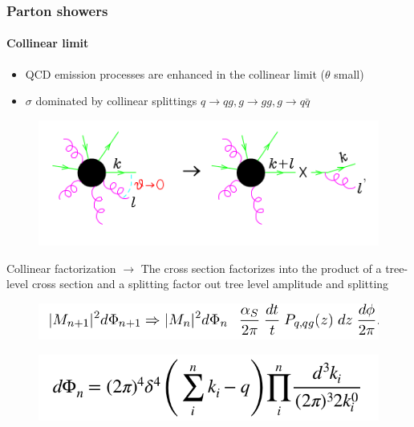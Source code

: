 \documentclass[aspectratio=43]{beamer}
\begin{document}
\begin{frame}

	\frametitle{Parton showers}
	\framesubtitle{Collinear limit}
	
	\begin{itemize} 
		\item \footnotesize QCD emission processes are enhanced in the collinear limit ($\theta$ small)
		\item \footnotesize $\sigma$ dominated by collinear splittings $q \rightarrow qg, g \rightarrow gg, g \rightarrow q\bar{q}$
	\end{itemize}
	
	\begin{figure}
		\includegraphics[width = 6 cm]{plots/collinear_factorization.png}
	\end{figure}
	
	\footnotesize Collinear factorization $\longrightarrow$ The cross section factorizes
	into the product of a tree-level cross section and a splitting
	factor out tree level amplitude and splitting
	\begin{figure}
		\includegraphics[width = 7 cm]{plots/eq_factorization_theorem.png}
	\end{figure}

	\begin{figure}
		\includegraphics[width = 5 cm]{plots/eq_factorization_ps.png}
	\end{figure}

\end{frame}
\end{document}
